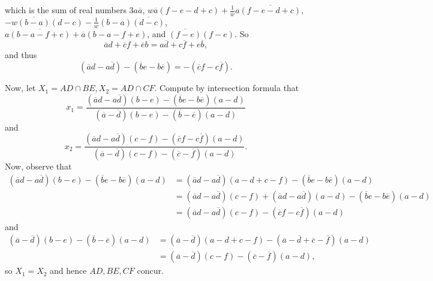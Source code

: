 which is the sum of real numbers $3a\overline{a}$, $w\overline{a}\left(f-e-d+c\right)+\frac{1}{w}a\overline{\left(f-e-d+c\right)}$, $-w\overline{\left(b-a\right)}\left(d-c\right)-\frac{1}{w}\left(b-a\right)\overline{\left(d-c\right)}$, $a\overline{\left(b-a-f+e\right)}+\overline{a}\left(b-a-f+e\right)$, and $\overline{\left(f-e\right)}\left(f-e\right)$. So \[\overline{a}d+\overline{c}f+\overline{e}b=a\overline{d}+c\overline{f}+e\overline{b},\] and thus \[\left(\overline{a}d-a\overline{d}\right)-\left(\overline{b}e-b\overline{e}\right)=-\left(\overline{c}f-c\overline{f}\right).\]

Now, let $X_1=AD\cap BE,X_2=AD\cap CF$. Compute by intersection formula that \[x_1=\frac{\left(\overline{a}d-a\overline{d}\right)\left(b-e\right)-\left(\overline{b}e-b\overline{e}\right)\left(a-d\right)}{\left(\overline{a}-\overline{d}\right)\left(b-e\right)-\left(\overline{b}-\overline{e}\right)\left(a-d\right)}\] and \[x_2=\frac{\left(\overline{a}d-a\overline{d}\right)\left(c-f\right)-\left(\overline{c}f-c\overline{f}\right)\left(a-d\right)}{\left(\overline{a}-\overline{d}\right)\left(c-f\right)-\left(\overline{c}-\overline{f}\right)\left(a-d\right)}.\] Now, observe that
\begin{align*}
	\left(\overline{a}d-a\overline{d}\right)\left(b-e\right)-\left(\overline{b}e-b\overline{e}\right)\left(a-d\right)&=\left(\overline{a}d-a\overline{d}\right)\left(a-d+c-f\right)-\left(\overline{b}e-b\overline{e}\right)\left(a-d\right)\\
	&=\left(\overline{a}d-a\overline{d}\right)\left(c-f\right)+\left(\overline{a}d-a\overline{d}\right)\left(a-d\right)-\left(\overline{b}e-b\overline{e}\right)\left(a-d\right)\\
	&=\left(\overline{a}d-a\overline{d}\right)\left(c-f\right)-\left(\overline{c}f-c\overline{f}\right)\left(a-d\right)
\end{align*}
and
\begin{align*}
	\left(\overline{a}-\overline{d}\right)\left(b-e\right)-\left(\overline{b}-\overline{e}\right)\left(a-d\right)&=\left(\overline{a}-\overline{d}\right)\left(a-d+c-f\right)-\left(\overline{a}-\overline{d}+\overline{c}-\overline{f}\right)\left(a-d\right)\\
	&=\left(\overline{a}-\overline{d}\right)\left(c-f\right)-\left(\overline{c}-\overline{f}\right)\left(a-d\right),
\end{align*}
so $X_1=X_2$ and hence $AD,BE,CF$ concur.